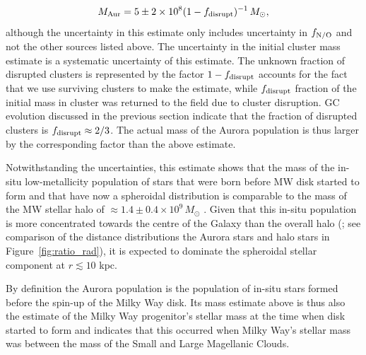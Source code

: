 \documentclass[a4paper,useAMS,usenatbib]{mnras}
\begin{document}
\begin{equation}
  M_{\rm Aur} = 5\pm 2 \times 10^8 (1-f_{\rm disrupt})^{-1}\, M_\odot,
  \label{eq:maur_est}
\end{equation}
although the uncertainty in this estimate only includes uncertainty in $f_{\rm N/O}$ and not the other sources listed above. The uncertainty in the initial cluster mass estimate is a systematic uncertainty of this estimate. The unknown fraction of disrupted clusters is represented by
the factor $1-f_{\rm disrupt}$ accounts for the fact that we use surviving clusters to make the estimate, while $f_{\rm disrupt}$ fraction of the initial mass in cluster was returned to the field due to cluster disruption. GC evolution discussed in the previous section indicate that the fraction of disrupted clusters is $f_{\rm disrupt}\approx 2/3$. The actual mass of the Aurora population is thus larger by the corresponding factor than the above estimate. 

Notwithstanding the uncertainties, this estimate shows that the mass of the in-situ low-metallicity population of stars that were born before MW disk started to form and that have now a spheroidal distribution is comparable to the mass of the MW stellar halo of $\approx 1.4\pm 0.4\times 10^9\, M_\odot$ \citep[e.g.,][]{Deason.etal.2019}. Given that this in-situ population is more concentrated towards the centre of the Galaxy than the overall halo (\citealt{Rix2022}; see comparison of the distance distributions the Aurora stars and halo stars in Figure~\ref{fig:ratio_rad}), it is expected to dominate the spheroidal stellar component at $r\lesssim 10$ kpc. 

By definition the Aurora population is the population of in-situ stars formed before the spin-up of the Milky Way disk. Its mass estimate above is thus also the estimate of the Milky Way progenitor's stellar mass at the time when disk started to form and indicates that this occurred when Milky Way's stellar mass was between the mass of the Small and Large Magellanic Clouds. 
\end{document}
